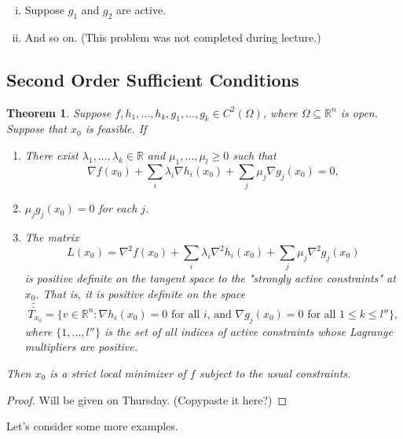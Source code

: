 \documentclass[11pt]{book}
\newcommand{\R}{\mathbb{R}}
\newtheorem{theorem}{Theorem}[subsection]
\begin{document}
\begin{enumerate}
\begin{enumerate}[(i)]
\item
Suppose $g_1$ and $g_2$ are active.

\item
And so on. (This problem was not completed during lecture.)
\end{enumerate}
\end{enumerate}

\subsection{Second Order Sufficient Conditions}

\begin{theorem}
Suppose $f, h_1, \dots, h_k, g_1, \dots, g_k \in C^2(\Omega)$, where $\Omega \subseteq \R^n$ is open. Suppose that $x_0$ is feasible. If
\begin{enumerate}
\item
There exist $\lambda_1, \dots, \lambda_k \in \R$ and $\mu_1, \dots, \mu_l \geq 0$ such that
\[
\nabla f(x_0) + \sum_i \lambda_i \nabla h_i(x_0) + \sum_j \mu_j \nabla g_j(x_0) = 0,
\]

\item
$\mu_j g_j(x_0) = 0$ for each $j$.

\item
The matrix
\[
L(x_0) = \nabla^2 f(x_0) + \sum_i \lambda_i \nabla^2 h_i(x_0) + \sum_j \mu_j \nabla^2 g_j(x_0)
\]
is positive definite on the tangent space to the "strongly active constraints" at $x_0$. That is, it is positive definite on the space
\[
\tilde{\tilde{T_{x_0}}} = \{ v \in \R^n : \nabla h_i(x_0) = 0 \text{ for all $i$, and } \nabla g_j(x_0) = 0 \text{ for all $1 \leq k \leq l''$} \},
\]
where $\{1, \dots, l''\}$ is the set of all indices of active constraints whose Lagrange multipliers are positive.
\end{enumerate}
Then $x_0$ is a strict local minimizer of $f$ subject to the usual constraints.
\end{theorem}
\begin{proof}
Will be given on Thursday. (Copypaste it here?)
\end{proof}

Let's consider some more examples.
\end{document}
